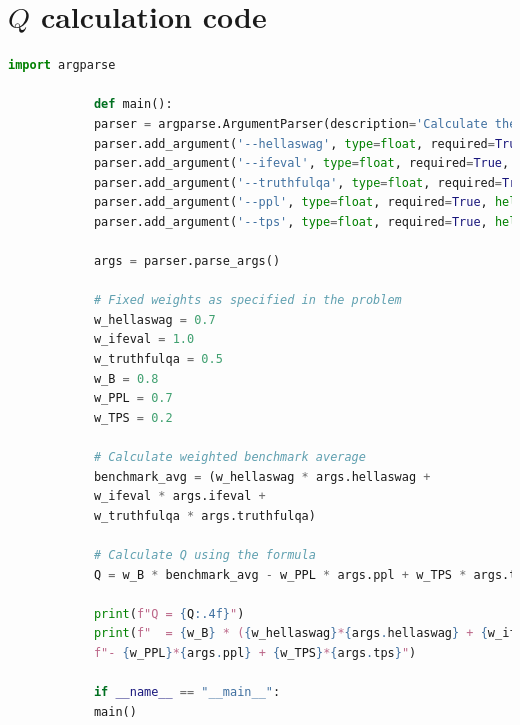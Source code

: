 \documentclass{ifacconf}
\begin{document}
	
	
	
	\pagebreak
	
	\printglossary[title={Glossary}]
	
	\vfill
	\clearpage
	\pagebreak
	
	\appendix
	
	\section{$Q$ calculation code}
	\label{appendix:q_calculation}
	\begin{minipage}{\textwidth}
		\begin{lstlisting}[language=Python]
			import argparse
			
			def main():
			parser = argparse.ArgumentParser(description='Calculate the Q metric.')
			parser.add_argument('--hellaswag', type=float, required=True, help='Hellaswag benchmark score')
			parser.add_argument('--ifeval', type=float, required=True, help='IFEval benchmark score')
			parser.add_argument('--truthfulqa', type=float, required=True, help='TruthfulQA benchmark score')
			parser.add_argument('--ppl', type=float, required=True, help='Perplexity (PPL) value')
			parser.add_argument('--tps', type=float, required=True, help='Tokens Per Second (TPS) value')
			
			args = parser.parse_args()
			
			# Fixed weights as specified in the problem
			w_hellaswag = 0.7
			w_ifeval = 1.0
			w_truthfulqa = 0.5
			w_B = 0.8
			w_PPL = 0.7
			w_TPS = 0.2
			
			# Calculate weighted benchmark average
			benchmark_avg = (w_hellaswag * args.hellaswag + 
			w_ifeval * args.ifeval + 
			w_truthfulqa * args.truthfulqa)
			
			# Calculate Q using the formula
			Q = w_B * benchmark_avg - w_PPL * args.ppl + w_TPS * args.tps
			
			print(f"Q = {Q:.4f}")
			print(f"  = {w_B} * ({w_hellaswag}*{args.hellaswag} + {w_ifeval}*{args.ifeval} + {w_truthfulqa}*{args.truthfulqa}) "
			f"- {w_PPL}*{args.ppl} + {w_TPS}*{args.tps}")
			
			if __name__ == "__main__":
			main()
		\end{lstlisting}
		
	\end{minipage}
	
	\vfill
	\clearpage
	\pagebreak
	
\end{document}
